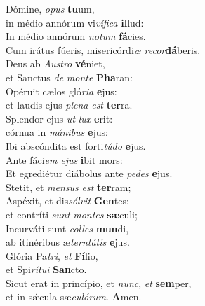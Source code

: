 \evenverse Dómine, \textit{o}\textit{pus} \textbf{tu}um,~\*\\
\evenverse in médio annórum vi\textit{ví}\textit{fi}\textit{ca} \textbf{il}lud:\\
\oddverse In médio annórum \textit{no}\textit{tum} \textbf{fá}cies.~\*\\
\oddverse Cum irátus fúeris, misericórdi\textit{æ} \textit{re}\textit{cor}\textbf{dá}beris.\\
\evenverse Deus ab \textit{Au}\textit{stro} \textbf{vé}niet,~\*\\
\evenverse et Sanctus \textit{de} \textit{mon}\textit{te} \textbf{Pha}ran:\\
\oddverse Opéruit cælos gló\textit{ri}\textit{a} \textbf{e}jus:~\*\\
\oddverse et laudis ejus \textit{ple}\textit{na} \textit{est} \textbf{ter}ra.\\
\evenverse Splendor ejus \textit{ut} \textit{lux} \textbf{e}rit:~\*\\
\evenverse córnua in \textit{má}\textit{ni}\textit{bus} \textbf{e}jus:\\
\oddverse Ibi abscóndita est forti\textit{tú}\textit{do} \textbf{e}jus.~\*\\
\oddverse Ante fáci\textit{em} \textit{e}\textit{jus} \textbf{i}bit mors:\\
\evenverse Et egrediétur diábolus ante \textit{pe}\textit{des} \textbf{e}jus.~\*\\
\evenverse Stetit, et \textit{men}\textit{sus} \textit{est} \textbf{ter}ram;\\
\oddverse Aspéxit, et dis\textit{sól}\textit{vit} \textbf{Gen}tes:~\*\\
\oddverse et contríti \textit{sunt} \textit{mon}\textit{tes} \textbf{sæ}culi;\\
\evenverse Incurváti sunt \textit{col}\textit{les} \textbf{mun}di,~\*\\
\evenverse ab itinéribus æ\textit{ter}\textit{ntá}\textit{tis} \textbf{e}jus.\\
\oddverse Glória Pa\textit{tri}, \textit{et} \textbf{Fí}lio,~\*\\
\oddverse et Spi\textit{rí}\textit{tu}\textit{i} \textbf{San}cto.\\
\evenverse Sicut erat in princípio, et \textit{nunc}, \textit{et} \textbf{sem}per,~\*\\
\evenverse et in sǽcula sæ\textit{cu}\textit{ló}\textit{rum}. \textbf{A}men.\\
